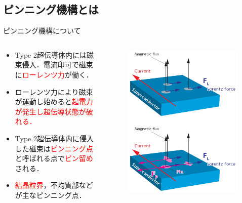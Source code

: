 \documentclass[aspectratio=169, unicode, 10pt]{beamer}
\begin{document}
	\subsection{ピンニング機構とは}
	\begin{frame}{ピンニング機構について}
		\begin{columns}
			\begin{column}{0.5\linewidth}
				\begin{block}{}
					\begin{itemize}
						\item Type 2超伝導体内には磁束侵入．電流印可で磁束に\textcolor{red}{ローレンツ力}が働く．
						\item ローレンツ力により磁束が運動し始めると\textcolor{red}{起電力が発生し超伝導状態が破れる．}
						\item Type 2超伝導体内に侵入した磁束は\textcolor{red}{ピンニング点}と呼ばれる点で\textcolor{red}{ピン留め}される．
						\item \textcolor{red}{結晶粒界}，不均質部などが主なピンニング点．
					\end{itemize}
				\end{block}
				
				\vspace{5mm}
				\centering
			\end{column}
			\begin{column}{0.5\linewidth}
				\begin{figure}
					\centering
					\includegraphics[width=0.8\linewidth]{figs/pinningforce.pdf}
				\end{figure}
			\end{column}
		\end{columns}
	\end{frame}
\end{document}
